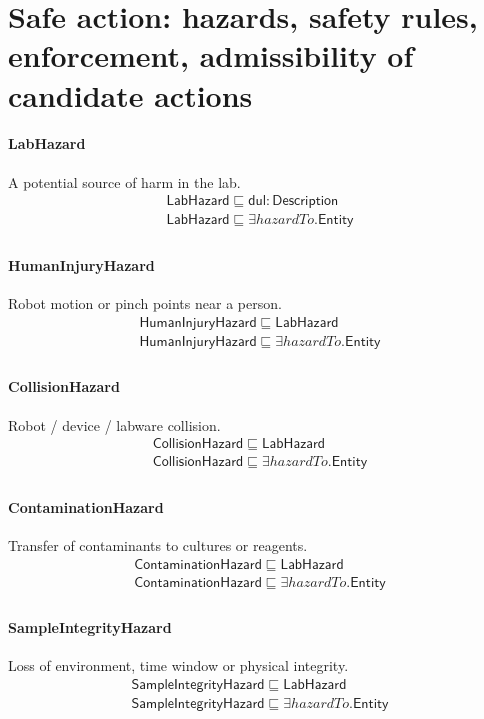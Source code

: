 \documentclass[10pt]{article}
\begin{document}
\section*{Safe action: hazards, safety rules, enforcement, admissibility of candidate actions}
\paragraph{LabHazard} A potential source of harm in the lab.
\[\begin{array}{l}
\mathsf{LabHazard} \sqsubseteq  \mathsf{dul{:}Description} \\
\mathsf{LabHazard} \sqsubseteq  \exists \mathit{hazardTo}.\mathsf{Entity} \\
\end{array}\]
\paragraph{HumanInjuryHazard} Robot motion or pinch points near a person.
\[\begin{array}{l}
\mathsf{HumanInjuryHazard} \sqsubseteq  \mathsf{LabHazard} \\
\mathsf{HumanInjuryHazard} \sqsubseteq  \exists \mathit{hazardTo}.\mathsf{Entity} \\
\end{array}\]
\paragraph{CollisionHazard} Robot / device / labware collision.
\[\begin{array}{l}
\mathsf{CollisionHazard} \sqsubseteq  \mathsf{LabHazard} \\
\mathsf{CollisionHazard} \sqsubseteq  \exists \mathit{hazardTo}.\mathsf{Entity} \\
\end{array}\]
\paragraph{ContaminationHazard} Transfer of contaminants to cultures or reagents.
\[\begin{array}{l}
\mathsf{ContaminationHazard} \sqsubseteq  \mathsf{LabHazard} \\
\mathsf{ContaminationHazard} \sqsubseteq  \exists \mathit{hazardTo}.\mathsf{Entity} \\
\end{array}\]
\paragraph{SampleIntegrityHazard} Loss of environment, time window or physical integrity.
\[\begin{array}{l}
\mathsf{SampleIntegrityHazard} \sqsubseteq  \mathsf{LabHazard} \\
\mathsf{SampleIntegrityHazard} \sqsubseteq  \exists \mathit{hazardTo}.\mathsf{Entity} \\
\end{array}\]
\end{document}
